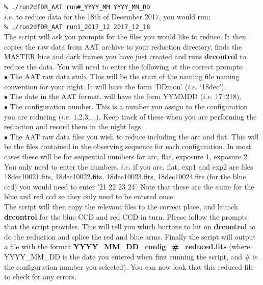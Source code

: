 \documentclass[12pt]{article}
\begin{document}
\texttt{\% ./run2dfDR\_AAT run\#\_YYYY\_MM YYYY\_MM\_DD}\\

$i.e.$ to reduce data for the 18th of December 2017, you would run:\\    

\texttt{\% ./run2dfDR\_AAT run1\_2017\_12 2017\_12\_18}\\

The script will ask you prompts for the files you would like to reduce. It then copies the raw data from AAT archive to your reduction directory, finds the MASTER bias and dark frames you have just created and runs \textbf{drcontrol} to reduce the data. You will need to enter the following at the correct prompts:\\

$\bullet$ The AAT raw data stub. This will be the start of the naming file naming convention for your night. It will have the form `DDmon' ($i.e.$ `18dec').\\

$\bullet$ The date in the AAT format. will have the form YYMMDD ($i.e.$ 171218).\\

$\bullet$ The configuration number. This is a number you assign to the configuration you are reducing ($i.e.$ 1,2,3,...). Keep track of these when you are performing the reduction and record them in the night logs. \\

$\bullet$ The AAT raw data files you wish to reduce including the arc and flat. This will be the files contained in the observing sequence for each configuration. In most cases these will be for sequential numbers for arc, flat, exposure 1, exposure 2. You only need to enter the numbers. $i.e.$ if you arc, flat, exp1 and exp2 are files 18dec10021.fits, 18dec10022.fits, 18dec10023.fits, 18dec10024.fits (for the blue ccd) you would need to enter '21 22 23 24'. Note that these are the same for the blue and red ccd so they only need to be entered once. \\

The script will then copy the relevant files to the correct place, and launch \textbf{drcontrol} for the blue CCD and red CCD in turn. Please follow the prompts that the script provides. This will tell you which buttons to hit on  \textbf{drcontrol} to do the reduction and splice the red and blue arms. Finally the script will output a file with the format \textbf{YYYY\_MM\_DD\_config\_\#\_reduced.fits} (where YYYY\_MM\_DD is the date you entered when first running the script, and \# is the configuration number you selected). You can now look that this reduced file to check for any errors. 
\end{document}

